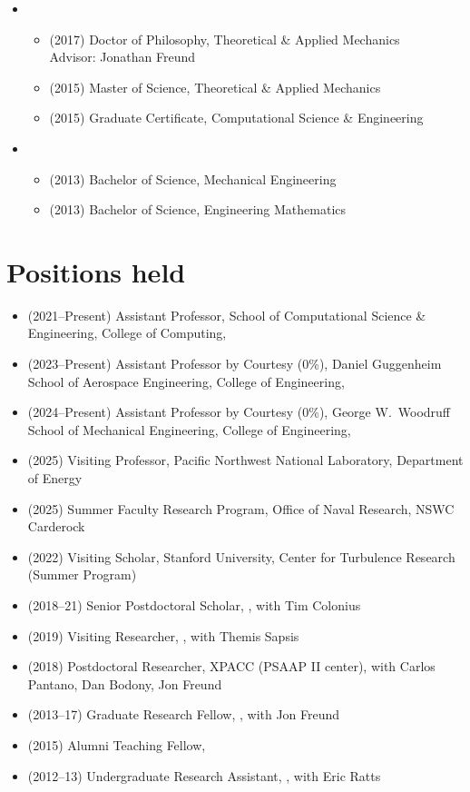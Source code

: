 \begin{itemize}
    \item \UIUC
    \begin{itemize}
        \item[] (2017) Doctor of Philosophy, Theoretical \& Applied Mechanics \\
            \phantom{(2017)} Advisor: Jonathan Freund
        \item[] (2015) Master of Science, Theoretical \& Applied Mechanics
        \item[] (2015) Graduate Certificate, Computational Science \& Engineering
    \end{itemize}
    \item \UMD
    \begin{itemize}
        \item[] (2013) Bachelor of Science, Mechanical Engineering
        \item[] (2013) Bachelor of Science, Engineering Mathematics
    \end{itemize}
\end{itemize}


\section{Positions held}

\begin{itemize}
    \item (2021--Present) Assistant Professor, School of Computational Science \& Engineering, College of Computing, \GIT
    \item (2023--Present) Assistant Professor by Courtesy (0\%), Daniel Guggenheim School of Aerospace Engineering, College of Engineering, \GIT
    \item (2024--Present) Assistant Professor by Courtesy (0\%), George W.\ Woodruff School of Mechanical Engineering, College of Engineering, \GIT
    \item (2025) Visiting Professor, Pacific Northwest National Laboratory, Department of Energy
    \item (2025) Summer Faculty Research Program, Office of Naval Research, NSWC Carderock
    \item (2022) Visiting Scholar, Stanford University, Center for Turbulence Research (Summer Program)
    \item (2018--21) Senior Postdoctoral Scholar, \CIT, with Tim Colonius
    \item (2019) Visiting Researcher, \MIT, with Themis Sapsis
    \item (2018) Postdoctoral Researcher, XPACC (PSAAP II center), with Carlos Pantano, Dan Bodony, Jon Freund
    \item (2013--17) Graduate Research Fellow, \UIUC, with Jon Freund
    \item (2015) Alumni Teaching Fellow, \UIUC
    \item (2012--13) Undergraduate Research Assistant, \UMD, with Eric Ratts
\end{itemize}

